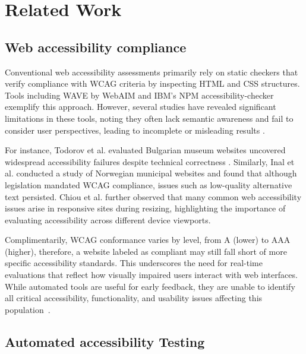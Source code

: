 
\section{Related Work}
\subsection{Web accessibility compliance}

Conventional web accessibility assessments primarily rely on static checkers that verify compliance with \ac{WCAG} criteria by inspecting HTML and CSS structures. Tools including WAVE by WebAIM\cite{webaim_wave_2025} and IBM's NPM accessibility-checker\cite{ibm_accessibility_checker_2025} exemplify this approach. However, several studies have revealed significant limitations in these tools, noting they often lack semantic awareness and fail to consider user perspectives, leading to incomplete or misleading results \cite{ara2024inclusive}. 

For instance, Todorov et al. evaluated Bulgarian museum websites uncovered widespread accessibility failures despite technical correctness \cite{todorov2022accessibility}. Similarly, Inal et al. conducted a study of Norwegian municipal websites and found that although legislation mandated \ac{WCAG} compliance, issues such as low-quality alternative text persisted.
Chiou et al. further observed that many common web accessibility issues arise in responsive sites during resizing, highlighting the importance of evaluating accessibility across different device viewports\cite{chiou2024automatically}.

Complimentarily, \ac{WCAG} conformance varies by level, from A (lower) to AAA (higher), therefore, a website labeled as compliant may still fall short of more specific accessibility standards. This underscores the need for real-time evaluations that reflect how visually impaired users interact with web interfaces. 
While automated tools are useful for early feedback, they are unable to identify all critical accessibility, functionality, and usability issues affecting this population~\cite{todorov2022accessibility}.


\subsection{Automated accessibility Testing}

